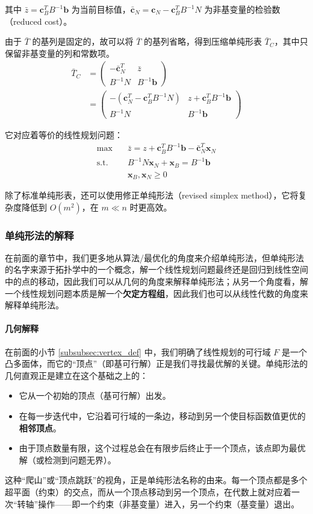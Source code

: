 \documentclass[12pt]{article}
\theoremstyle{plain}
\theoremstyle{definition}
\newcommand{\st}{\mathrel{\text{s.t.}}}
\begin{document}
其中 $\bar{z} = \bm{c}_B^T B^{-1} \bm{b}$ 为当前目标值，$\bar{\bm{c}}_N = \bm{c}_N - \bm{c}_B^T B^{-1} N$ 为非基变量的检验数（reduced cost）。

由于 $\bar{T}$ 的基列是固定的，故可以将 $\bar{T}$ 的基列省略，得到压缩单纯形表 $\bar{T}_C$，其中只保留非基变量的列和常数项。
\begin{align*}
    \bar{T}_C &= \begin{pmatrix}        
        -\bar{\bm{c}}_N^T & \bar{z} \\
        B^{-1} N & B^{-1} \bm{b}
    \end{pmatrix} \\
    &= \begin{pmatrix}        
        -(\bm{c}_N^T - \bm{c}_B^T B^{-1} N) & z + \bm{c}_B^T B^{-1} \bm{b} \\
        B^{-1} N & B^{-1} \bm{b}
    \end{pmatrix}
\end{align*}

它对应着等价的线性规划问题：
\begin{align*}
    \max \quad & \bar{z} = z + \bm{c}_B^T B^{-1} \bm{b} - \bar{\bm{c}}_N^T \bm{x}_N \\
    \st \quad & B^{-1} N \bm{x}_N + \bm{x}_B = B^{-1} \bm{b} \\
    & \bm{x}_B, \bm{x}_N \geq 0
\end{align*}

除了标准单纯形表，还可以使用修正单纯形法（revised simplex method），它将复杂度降低到 $O(m^2)$，在 $m \ll n$ 时更高效。

\subsubsection{单纯形法的解释}\label{subsubsec:simplex_explanation}

在前面的章节中，我们更多地从算法/最优化的角度来介绍单纯形法，但单纯形法的名字来源于拓扑学中的一个概念，解一个线性规划问题最终还是回归到线性空间中的点的移动，因此我们可以从几何的角度来解释单纯形法；从另一个角度看，解一个线性规划问题本质是解一个\textbf{欠定方程组}，因此我们也可以从线性代数的角度来解释单纯形法。

\paragraph{几何解释}
在前面的小节 \ref{subsubsec:vertex_def} 中，我们明确了线性规划的可行域 $F$ 是一个凸多面体，而它的“顶点”（即基可行解）正是我们寻找最优解的关键。单纯形法的几何直观正是建立在这个基础之上的：
\begin{itemize}
    \item 它从一个初始的顶点（基可行解）出发。
    \item 在每一步迭代中，它沿着可行域的一条边，移动到另一个使目标函数值更优的\textbf{相邻顶点}。
    \item 由于顶点数量有限，这个过程总会在有限步后终止于一个顶点，该点即为最优解（或检测到问题无界）。
\end{itemize}
这种“爬山”或“顶点跳跃”的视角，正是单纯形法名称的由来。每一个顶点都是多个超平面（约束）的交点，而从一个顶点移动到另一个顶点，在代数上就对应着一次“转轴”操作——即一个约束（非基变量）进入，另一个约束（基变量）退出。
\end{document}
